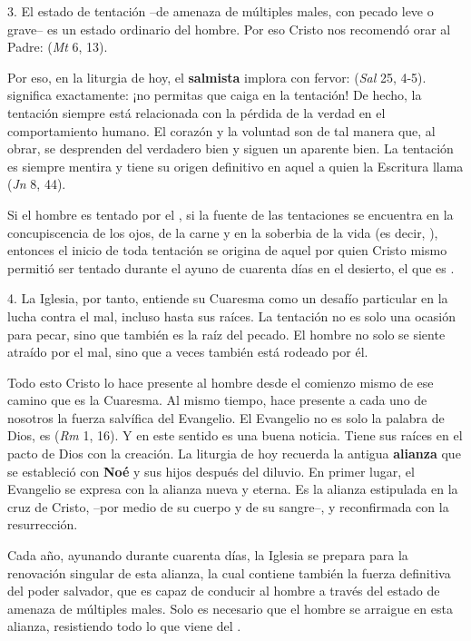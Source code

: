 \begin{body}
3. El estado de tentación –de amenaza de múltiples males, con pecado leve o grave– es un estado ordinario del hombre. Por eso Cristo nos recomendó orar al Padre:  (\textit{Mt} 6, 13).

Por eso, en la liturgia de hoy, el \textbf{salmista} implora con fervor:  (\textit{Sal} 25, 4-5).  significa exactamente: ¡no permitas que caiga en la tentación! De hecho, la tentación siempre está relacionada con la pérdida de la verdad en el comportamiento humano. El corazón y la voluntad son  de tal manera que, al obrar, se desprenden del verdadero bien y siguen un aparente bien. La tentación es siempre mentira y tiene su origen definitivo en aquel a quien la Escritura llama  (\textit{Jn} 8, 44).

Si el hombre es tentado por el , si la fuente de las tentaciones se encuentra en la concupiscencia de los ojos, de la carne y en la soberbia de la vida (es decir, ), entonces el inicio de toda tentación se origina de aquel por quien Cristo mismo permitió ser tentado durante el ayuno de cuarenta días en el desierto, el que es .

4. La Iglesia, por tanto, entiende su Cuaresma como un desafío particular en la lucha contra el mal, incluso hasta sus raíces. La tentación no es solo una ocasión para pecar, sino que también es la raíz del pecado. El hombre no solo se siente atraído por el mal, sino que a veces también está rodeado por él.

Todo esto Cristo lo hace presente al hombre desde el comienzo mismo de ese camino que es la Cuaresma. Al mismo tiempo, hace presente a cada uno de nosotros la fuerza salvífica del Evangelio. El Evangelio no es solo la palabra de Dios, es  (\textit{Rm} 1, 16). Y en este sentido es una buena noticia. Tiene sus raíces en el pacto de Dios con la creación. La liturgia de hoy recuerda la antigua \textbf{alianza} que se estableció con \textbf{Noé} y sus hijos después del diluvio. En primer lugar, el Evangelio se expresa con la alianza nueva y eterna. Es la alianza estipulada en la cruz de Cristo, –por medio de su cuerpo y de su sangre–, y reconfirmada con la resurrección.

Cada año, ayunando durante cuarenta días, la Iglesia se prepara para la renovación singular de esta alianza, la cual contiene también la fuerza definitiva del poder salvador, que es capaz de conducir al hombre a través del estado de amenaza de múltiples males. Solo es necesario que el hombre se arraigue en esta alianza, resistiendo todo lo que viene del .


\end{body}

